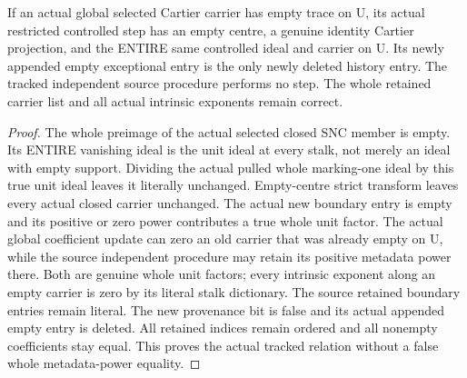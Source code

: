 \begin{lemma}
\label{hir:nc-ordered-open-trace-empty-control}
\leanok
{}
If an actual global selected Cartier carrier has empty trace on U, its actual
restricted controlled step has an empty centre, a genuine identity Cartier
projection, and the ENTIRE same controlled ideal and carrier on U. Its newly
appended empty exceptional entry is the only newly deleted history entry.
The tracked independent source procedure performs no step. The whole retained
carrier list and all actual intrinsic exponents remain correct.
\end{lemma}
\begin{proof}
The whole preimage of the actual selected closed SNC member is empty. Its
ENTIRE vanishing ideal is the unit ideal at every stalk, not merely an ideal
with empty support. Dividing the actual pulled whole marking-one ideal by this
true unit ideal leaves it literally unchanged. Empty-centre strict transform
leaves every actual closed carrier unchanged. The actual new boundary entry
is empty and its positive or zero power contributes a true whole unit factor.
The actual global coefficient update can zero an old carrier that was already
empty on U, while the source independent procedure may retain its positive
metadata power there. Both are genuine whole unit factors; every intrinsic
exponent along an empty carrier is zero by its literal stalk dictionary.
The source retained boundary entries remain literal. The new provenance bit
is false and its actual appended empty entry is deleted. All retained indices
remain ordered and all nonempty coefficients stay equal. This proves the
actual tracked relation without a false whole metadata-power equality.
\end{proof}

